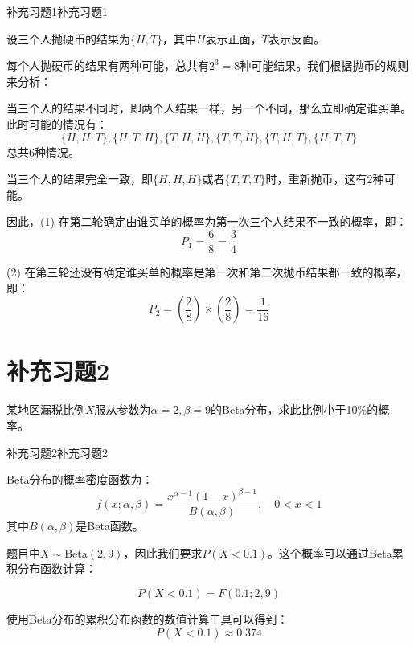 \documentclass[twoside]{article}
\begin{document}
\begin{ans}{补充习题1}{补充习题1}

设三个人抛硬币的结果为$\{H, T\}$，其中$H$表示正面，$T$表示反面。

每个人抛硬币的结果有两种可能，总共有$2^3 = 8$种可能结果。我们根据抛币的规则来分析：

当三个人的结果不同时，即两个人结果一样，另一个不同，那么立即确定谁买单。此时可能的情况有：
    \[
    \{H, H, T\}, \{H, T, H\}, \{T, H, H\}, \{T, T, H\}, \{T, H, T\}, \{H, T, T\}
    \]
    总共6种情况。

当三个人的结果完全一致，即$\{H, H, H\}$或者$\{T, T, T\}$时，重新抛币，这有2种可能。

因此，(1) 在第二轮确定由谁买单的概率为第一次三个人结果不一致的概率，即：
\[
P_1 = \frac{6}{8} = \frac{3}{4}
\]

(2) 在第三轮还没有确定谁买单的概率是第一次和第二次抛币结果都一致的概率，即：
\[
P_2 = \left( \frac{2}{8} \right) \times \left( \frac{2}{8} \right) = \frac{1}{16}
\]

\end{ans}

\section{补充习题2}

某地区漏税比例$X$服从参数为$\alpha = 2, \beta = 9$的Beta分布，求此比例小于10\%的概率。

\begin{ans}{补充习题2}{补充习题2}

Beta分布的概率密度函数为：
\[
f(x; \alpha, \beta) = \frac{x^{\alpha-1}(1-x)^{\beta-1}}{B(\alpha,\beta)}, \quad 0 < x < 1
\]
其中$B(\alpha,\beta)$是Beta函数。

题目中$X \sim \text{Beta}(2, 9)$，因此我们要求$P(X < 0.1)$。这个概率可以通过Beta累积分布函数计算：

\[
P(X < 0.1) = F(0.1; 2, 9)
\]

使用Beta分布的累积分布函数的数值计算工具可以得到：
\[
P(X < 0.1) \approx 0.374
\]

\end{ans}
\end{document}
